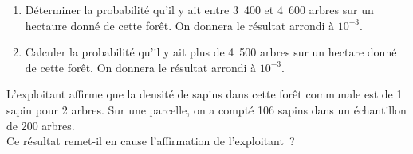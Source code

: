 \begin{enumerate}
     \item Déterminer la probabilité qu'il y ait entre 3~400 et 4~600 arbres sur un hectaure donné de cette forêt. On donnera le résultat arrondi à $10^{-3}$.
     \item Calculer la probabilité qu'il y ait plus de 4~500 arbres sur un hectare donné de cette forêt.
     On donnera le résultat arrondi à $10^{-3}$.
\end{enumerate}
\medbreak
{}
\smallbreak
L'exploitant affirme que la densité de sapins dans cette forêt communale est de 1 sapin pour 2 arbres.
\smallbreak
Sur une parcelle, on a compté 106 sapins dans un échantillon de 200 arbres.\\
Ce résultat remet-il en cause l'affirmation de l'exploitant~?
\par
